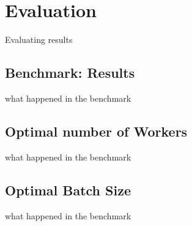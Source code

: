 \chapter{Evaluation}
\label{ch:evaluation}
Evaluating results

\section{Benchmark: Results}
\label{sec:evaluation:benchmark}
what happened in the benchmark

\section{Optimal number of Workers}
\label{sec:evaluation:workers}
what happened in the benchmark

\section{Optimal Batch Size}
\label{sec:evaluation:batch}
what happened in the benchmark